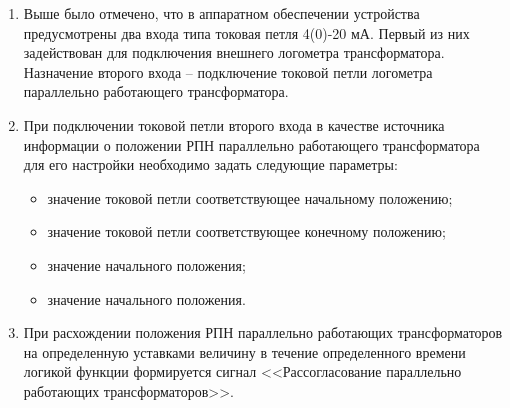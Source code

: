 \begin{enumerate}
\begin{enumerate}
\item Выше было отмечено, что в аппаратном обеспечении устройства предусмотрены два входа типа токовая петля 4(0)-20 мА. Первый из них задействован для подключения внешнего логометра трансформатора. Назначение второго входа -- подключение токовой петли логометра параллельно работающего трансформатора.
\item При подключении токовой петли второго входа в качестве источника информации о положении РПН параллельно работающего трансформатора для его настройки необходимо задать следующие параметры:
\begin{itemize}
\item значение токовой петли соответствующее начальному положению;
\item значение токовой петли соответствующее конечному положению;
\item значение начального положения;
\item значение начального положения.
\end{itemize}
\item 
При расхождении положения РПН параллельно работающих трансформаторов на определенную уставками величину в течение определенного времени логикой функции формируется сигнал <<Рассогласование параллельно работающих трансформаторов>>.
\end{enumerate}

\end{enumerate}